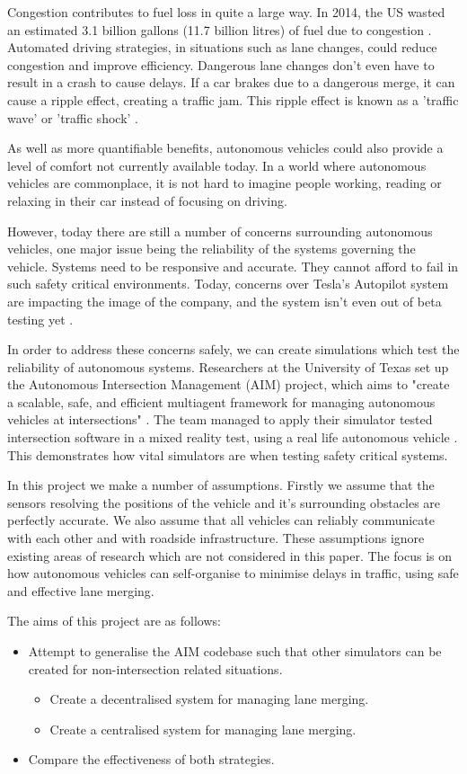 Congestion contributes to fuel loss in quite a large way. In 2014, the US wasted an estimated 3.1 billion gallons (11.7 billion litres) of fuel due to congestion \citep{Schrank2015}. Automated driving strategies, in situations such as lane changes, could reduce congestion and improve efficiency. Dangerous lane changes don't even have to result in a crash to cause delays. If a car brakes due to a dangerous merge, it can cause a ripple effect, creating a traffic jam. This ripple effect is known as a 'traffic wave' or 'traffic shock' \citep{Daganzo1994}.

As well as more quantifiable benefits, autonomous vehicles could also provide a level of comfort not currently available today. In a world where autonomous vehicles are commonplace, it is not hard to imagine people working, reading or relaxing in their car instead of focusing on driving. 

However, today there are still a number of concerns surrounding autonomous vehicles, one major issue being the reliability of the systems governing the vehicle. Systems need to be responsive and accurate. They cannot afford to fail in such safety critical environments. Today, concerns over Tesla's Autopilot system are impacting the image of the company, and the system isn't even out of beta testing yet \citep{TeslaCriticised}. 

In order to address these concerns safely, we can create simulations which test the reliability of autonomous systems. Researchers at the University of Texas set up the Autonomous Intersection Management (AIM) project, which aims to "create a scalable, safe, and efficient multiagent framework for managing autonomous vehicles at intersections" \citep{AIMProject}. The team managed to apply their simulator tested intersection software in a mixed reality test, using a real life autonomous vehicle \citep{Quinlan2010}. This demonstrates how vital simulators are when testing safety critical systems.

In this project we make a number of assumptions. Firstly we assume that the sensors resolving the positions of the vehicle and it's surrounding obstacles are perfectly accurate. We also assume that all vehicles can reliably communicate with each other and with roadside infrastructure. These assumptions ignore existing areas of research which are not considered in this paper. The focus is on how autonomous vehicles can self-organise to minimise delays in traffic, using safe and effective lane merging.

The aims of this project are as follows:
\begin{itemize}
\item Attempt to generalise the AIM codebase such that other simulators can be created for non-intersection related situations.
\begin{itemize}
\item Create a decentralised system for managing lane merging.
\item Create a centralised system for managing lane merging.
\end{itemize}
\item Compare the effectiveness of both strategies.
\end{itemize}